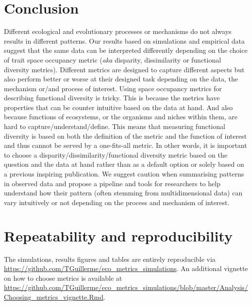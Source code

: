 \documentclass[12pt,letterpaper]{article}
\begin{document}
\section{Conclusion}
Different ecological and evolutionary processes or mechanisms do not always results in different patterns.
Our results based on simulations and empirical data suggest that the same data can be interpreted differently depending on the choice of trait space occupancy metric (\textit{aka} disparity, dissimilarity or functional diversity metrics).
Different metrics are designed to capture different aspects \citep{guillerme2020shifting,mammola2021concepts} but also perform better or worse at their designed task depending on the data, the mechanism or/and process of interest.
Using space occupancy metrics for describing functional diversity is tricky.
This is because the metrics have properties that can be counter intuitive based on the data at hand.
And also because functions of ecosystems, or the organisms and niches within them, are hard to capture/understand/define.
This means that measuring functional diversity is based on both the definition of the metric and the function of interest and thus cannot be served by a one-fits-all metric.
In other words, it is important to choose a disparity/dissimilarity/functional diversity metric based on the question and the data at hand rather than as a default option or solely based on a previous inspiring publication.
We suggest caution when summarising patterns in observed data and propose a pipeline and tools for researchers to help understand how their pattern (often stemming from multidimensional data) can vary intuitively or not depending on the process and mechanism of interest.

\section{Repeatability and reproducibility}
The simulations, results figures and tables are entirely reproducible via \url{https://github.com/TGuillerme/eco_metrics_simulations}.
An additional vignette on how to choose metrics is available at \url{https://github.com/TGuillerme/eco_metrics_simulations/blob/master/Analysis/Choosing_metrics_vignette.Rmd}.







\end{document}
